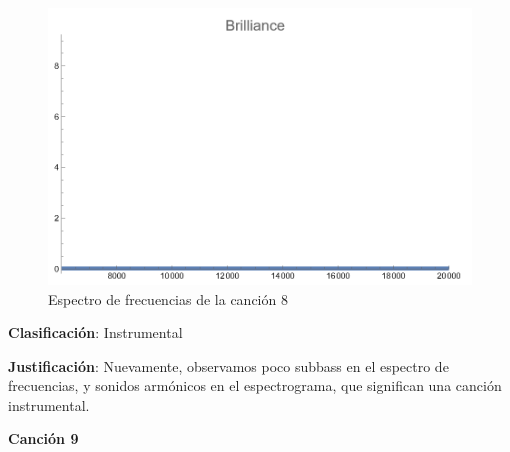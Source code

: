 \documentclass[12pt, letterpaper]{article}
\begin{document}
\begin{figure}[H]
\begin{minipage}{.3\textwidth}
  \end{minipage}
  \begin{minipage}{0.03\textwidth}\end{minipage}
  \begin{minipage}{.3\textwidth}
    \centering
    \includegraphics[width=.9\linewidth]{imgs/Cancion8/brilliance.png}
  \end{minipage}
  \caption{Espectro de frecuencias de la canción 8}
  \label{fig:esp08}
\end{figure}

\textbf{Clasificación}: Instrumental

\textbf{Justificación}: Nuevamente, observamos poco subbass en el espectro de
frecuencias, y sonidos armónicos en el espectrograma, que significan una canción
instrumental.

\newpage

\textbf{\large{Canción 9}}
\end{document}
